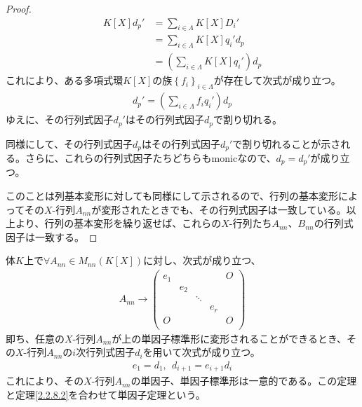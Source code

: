\documentclass[dvipdfmx]{jsarticle}
\begin{document}
\begin{proof}
\begin{align*}
K[ X] d_{p}' &= \sum_{i \in \varLambda} {K[ X] D_{i}'}\\
&= \sum_{i \in \varLambda} {K[ X] q_{i}'d_{p}}\\
&= \left( \sum_{i \in \varLambda} {K[ X] q_{i}'} \right)d_{p}
\end{align*}
これにより、ある多項式環$K[ X]$の族$\left\{ f_{i} \right\}_{i \in \varLambda}$が存在して次式が成り立つ。
\begin{align*}
d_{p}' = \left( \sum_{i \in \varLambda} {f_{i}q_{i}'} \right)d_{p}
\end{align*}
ゆえに、その行列式因子$d_{p}'$はその行列式因子$d_{p}$で割り切れる。\par
同様にして、その行列式因子$d_{p}$はその行列式因子$d_{p}'$で割り切れることが示される。さらに、これらの行列式因子たちどちらもmonicなので、$d_{p} = d_{p}'$が成り立つ。\par
このことは列基本変形に対しても同様にして示されるので、行列の基本変形によってその$X$-行列$A_{nn}$が変形されたときでも、その行列式因子は一致している。以上より、行列の基本変形を繰り返せば、これらの$X$-行列たち$A_{nn}$、$B_{nn}$の行列式因子は一致する。
\end{proof}
\begin{thm}[単因子定理]\label{2.2.8.6}
体$K$上で$\forall A_{nn} \in M_{nn}\left( K[ X] \right)$に対し、次式が成り立つ、
\begin{align*}
A_{nn} \rightarrow \begin{pmatrix}
e_{1} & \  & \  & \  & O \\
\  & e_{2} & \  & \  & \  \\
\  & \  & \ddots & \  & \  \\
\  & \  & \  & e_{r} & \  \\
O & \  & \  & \  & O \\
\end{pmatrix}
\end{align*}
即ち、任意の$X$-行列$A_{nn}$が上の単因子標準形に変形されることができるとき、その$X$-行列$A_{nn}$の$i$次行列式因子$d_{i}$を用いて次式が成り立つ。
\begin{align*}
e_{1} = d_{1},\ \ d_{i + 1} = e_{i + 1}d_{i}
\end{align*}
これにより、その$X$-行列$A_{nn}$の単因子、単因子標準形は一意的である。この定理と定理\ref{2.2.8.2}を合わせて単因子定理という。
\end{thm}
\end{document}
